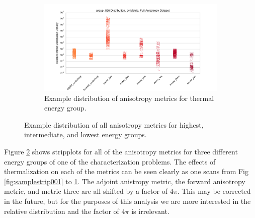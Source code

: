\begin{figure}[htb]\ContinuedFloat
  \begin{subfigure}[t]{\textwidth}
    \centering
    \includegraphics[width=0.95\linewidth]{./chapters/characterization_probs/figures/sample_data/group_026_strip_full.pdf}
    \caption{Example distribution of anisotropy metrics for thermal energy group.}
    \label{fig:samplestrip026}
  \end{subfigure}
  \caption[Example distribution of all anisotropy metrics for highest,
  intermediate, and lowest energy groups.]{Example distribution of all
  anisotropy metrics for highest, intermediate, and lowest energy groups.}
  \label{fig:samplestrips}
\end{figure}

Figure \ref{fig:samplestrips} shows stripplots for all of the anisotropy metrics
for three different energy groups of one of the characterization problems. The
effects of thermalization on each of the metrics can be seen clearly as one
scans from Fig \ref{fig:samplestrip001} to \ref{fig:samplestrip026}. The adjoint
anistropy metric, the forward anisotropy metric, and metric three are all
shifted by a factor of $4\pi$. This may be corrected in the future, but for the
purposes of this analysis we are more interested in the relative distribution
and the factor of $4\pi$ is irrelevant.

